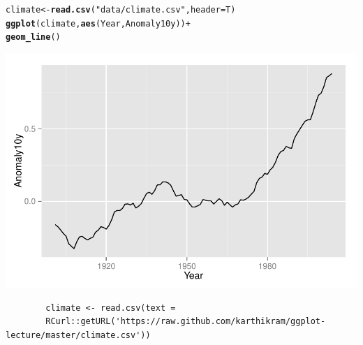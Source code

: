 \documentclass{beamer}\usepackage[]{graphicx}\usepackage[]{color}
\makeatletter
\newcommand{\hlstr}[1]{\textcolor[rgb]{0.192,0.494,0.8}{#1}}%
\newcommand{\hlopt}[1]{\textcolor[rgb]{0,0,0}{#1}}%
\newcommand{\hlstd}[1]{\textcolor[rgb]{0.345,0.345,0.345}{#1}}%
\newcommand{\hlkwb}[1]{\textcolor[rgb]{0.69,0.353,0.396}{#1}}%
\newcommand{\hlkwc}[1]{\textcolor[rgb]{0.333,0.667,0.333}{#1}}%
\newcommand{\hlkwd}[1]{\textcolor[rgb]{0.737,0.353,0.396}{\textbf{#1}}}%
\newenvironment{kframe}{%
 \def\at@end@of@kframe{}%
 \ifinner\ifhmode%
  \def\at@end@of@kframe{\end{minipage}}%
  \begin{minipage}{\columnwidth}%
 \fi\fi%
 \def\FrameCommand##1{\hskip\@totalleftmargin \hskip-\fboxsep
 \colorbox{shadecolor}{##1}\hskip-\fboxsep
     \hskip-\linewidth \hskip-\@totalleftmargin \hskip\columnwidth}%
 \MakeFramed {\advance\hsize-\width
   \@totalleftmargin\z@ \linewidth\hsize
   \@setminipage}}%
 {\par\unskip\endMakeFramed%
 \at@end@of@kframe}
\newenvironment{knitrout}{}{} %
\makeatother
\begin{document}
\begin{frame}[fragile]
\begin{knitrout}\footnotesize
{}\color{fgcolor}\begin{kframe}


{\ttfamily\noindent\bfseries\color{errorcolor}{\#\# Error: cannot change working directory}}\end{kframe}
\end{knitrout}
\begin{knitrout}\footnotesize
{}\color{fgcolor}\begin{kframe}
\begin{alltt}
\hlstd{climate} \hlkwb{<-} \hlkwd{read.csv}\hlstd{(}\hlstr{"data/climate.csv"}\hlstd{,} \hlkwc{header} \hlstd{= T)}
\hlkwd{ggplot}\hlstd{(climate,} \hlkwd{aes}\hlstd{(Year, Anomaly10y))} \hlopt{+}
\hlkwd{geom_line}\hlstd{()}
\end{alltt}
\end{kframe}

{\centering \includegraphics[width=.75\linewidth]{figure/linea_} 

}



\end{knitrout}
\begin{flushright}
\begingroup
    \fontsize{6pt}{12pt}\selectfont
    \begin{verbatim}
        climate <- read.csv(text =
        RCurl::getURL('https://raw.github.com/karthikram/ggplot-lecture/master/climate.csv'))
    \end{verbatim}
\endgroup
\end{flushright}
\end{frame}
\end{document}
